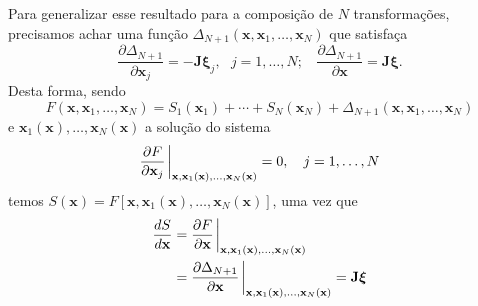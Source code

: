 \documentclass[
	12pt,
	oneside,			%
	a4paper,			%
	english,			%
	brazil				%
	]{abntex2}
\theoremstyle{definition}
\begin{document}
Para generalizar esse resultado para a composição de $N$ transformações, precisamos achar uma função $\Delta_{N+1}\left(\mathbf{x},\mathbf{x}_1,\ldots,\mathbf{x}_N\right)$ que satisfaça
\begin{equation}
    \frac{\partial \Delta_{N+1}}{\partial \mathbf{x}_j} = - \mathbf{J} \boldsymbol{\xi}_j, \ \ \ j = 1,\ldots,N; \ \ \ \ \frac{\partial \Delta_{N+1}}{\partial \mathbf{x}} = \mathbf{J} \boldsymbol{\xi}.
\end{equation}
Desta forma, sendo
\begin{equation}
    F(\mathbf{x},\mathbf{x}_1,\ldots,\mathbf{x}_N) = S_1\left(\mathbf{x}_1\right) + \cdots +  S_N \left(\mathbf{x}_N\right) + \Delta_{N+1}\left(\mathbf{x},\mathbf{x}_1,\ldots,\mathbf{x}_N\right)
\end{equation}
e $\mathbf{x}_1\left(\mathbf{x}\right), \ldots, \mathbf{x}_N\left(\mathbf{x}\right)$ a solução do sistema
\begin{equation}
    \label{limite_estacionario}
    \frac{\partial F}{\partial \mathbf{x}_j} \eval_{\mathbf{x},\mathbf{x}_1\left(\mathbf{x}\right), \ldots, \mathbf{x}_N\left(\mathbf{x}\right)} = 0, \ \ \ j = 1,\ldots,N
\end{equation}
temos $S(\mathbf{x}) = F \left[\mathbf{x},\mathbf{x}_1\left(\mathbf{x}\right), \ldots, \mathbf{x}_N\left(\mathbf{x}\right)\right]$, uma vez que
\begin{equation}
    \begin{aligned}
        \frac{d S}{d \mathbf{x}} &= \frac{\partial F}{\partial \mathbf{x}} \eval_{\mathbf{x},\mathbf{x}_1\left(\mathbf{x}\right), \ldots, \mathbf{x}_N\left(\mathbf{x}\right)}  \\ &= \frac{\partial \Delta_{N+1}}{\partial \mathbf{x}}\eval_{\mathbf{x},\mathbf{x}_1\left(\mathbf{x}\right), \ldots, \mathbf{x}_N\left(\mathbf{x}\right)} =  \mathbf{J} \boldsymbol{\xi}
    \end{aligned}
\end{equation}
\end{document}
